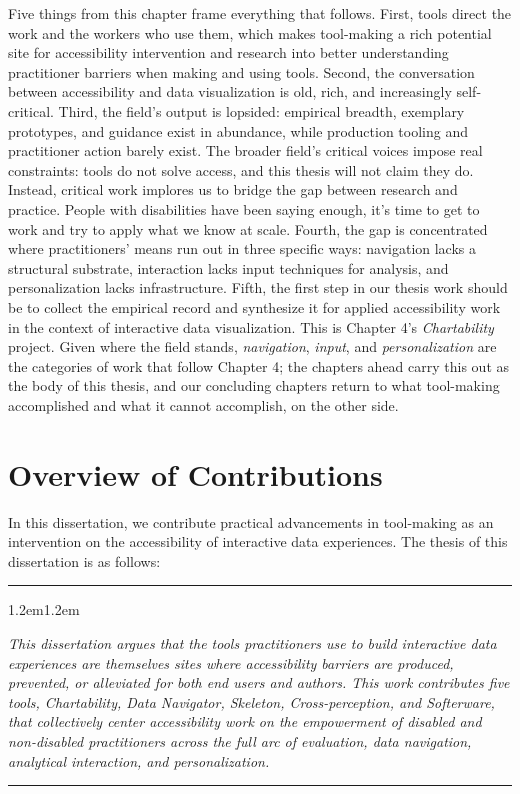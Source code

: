 \documentclass[12pt]{cmuthesis}
\newcommand{\thesisstatement}[1]{%
  \par\addvspace{1\baselineskip}%
  {\centering\noindent\rule{0.5\linewidth}{0.4pt}\par}%
  \addvspace{0.7\baselineskip}%
  \begin{adjustwidth}{1.2em}{1.2em}%
  {\itshape #1\par}%
  \end{adjustwidth}%
  \addvspace{0.7\baselineskip}%
  {\centering\noindent\rule{0.5\linewidth}{0.4pt}\par}%
  \addvspace{1\baselineskip}%
}
\begin{document}
Five things from this chapter frame everything that follows. First, tools direct the work and the workers who use them, which makes tool-making a rich potential site for accessibility intervention and research into better understanding practitioner barriers when making and using tools. Second, the conversation between accessibility and data visualization is old, rich, and increasingly self-critical. Third, the field's output is lopsided: empirical breadth, exemplary prototypes, and guidance exist in abundance, while production tooling and practitioner action barely exist. The broader field's critical voices impose real constraints: tools do not solve access, and this thesis will not claim they do. Instead, critical work implores us to bridge the gap between research and practice. People with disabilities have been saying enough, it's time to get to work and try to apply what we know at scale. Fourth, the gap is concentrated where practitioners' means run out in three specific ways: navigation lacks a structural substrate, interaction lacks input techniques for analysis, and personalization lacks infrastructure. Fifth, the first step in our thesis work should be to collect the empirical record and synthesize it for applied accessibility work in the context of interactive data visualization. This is Chapter 4's \textit{Chartability} project. Given where the field stands, \textit{navigation}, \textit{input}, and \textit{personalization} are the categories of work that follow Chapter 4; the chapters ahead carry this out as the body of this thesis, and our concluding chapters return to what tool-making accomplished and what it cannot accomplish, on the other side.

\chapter{Overview of Contributions}
In this dissertation, we contribute practical advancements in tool-making as an intervention on the accessibility of interactive data experiences. The thesis of this dissertation is as follows:

\thesisstatement{This dissertation argues that the tools practitioners use to build interactive data experiences are themselves sites where accessibility barriers are produced, prevented, or alleviated for both end users and authors. This work contributes five tools, Chartability, Data Navigator, Skeleton, Cross-perception, and Softerware, that collectively center accessibility work on the empowerment of disabled and non-disabled practitioners across the full arc of evaluation, data navigation, analytical interaction, and personalization.}
\end{document}
